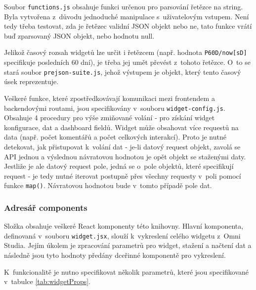 \documentclass[czech, bc, kiv, he, iso690numb]{fasthesis}
\begin{document}
Soubor \texttt{functions.js} obsahuje funkci určenou pro parsování řetězce na string. Byla vytvořena z~důvodu jednoduché manipulace s~uživatelovým vstupem. Není tedy třeba
testovat, zda je řetězec validní JSON objekt nebo ne, tato funkce vrátí buď zparsovaný JSON objekt, nebo hodnotu null.

Jelikož časový rozsah widgetů lze určit i řetězcem (např. hodnota \texttt{P60D/now[sD]} specifikuje posledních 60 dní), je třeba jej umět převést z~tohoto řetězce. O~to se stará soubor
\texttt{prejson-suite.js}, jehož výstupem je objekt, který tento časový úsek reprezentuje.

Veškeré funkce, které zpostředkovávají komunikaci mezi frontendem a backendovými routami, jsou specifikovány v~souboru \texttt{widget-config.js}. Obsahuje 4 procedury pro výše zmiňované
volání - pro získání widget konfigurace, dat a dashboard fieldů. Widget může obsahovat více requestů na data (např. počet komentářů a počet celkových interakcí). Proto je nutné detekovat,
jak přistupovat k~volání dat - je-li datový request objekt, zavolá se API jednou a výslednou návratovou hodnotou je opět objekt se staženými daty. Jestliže je ale datový request pole, jedná se o~pole objektů, které specifikují request - je tedy
nutné iterovat postupně přes všechny requesty v~poli pomocí funkce \texttt{map()}. Návratovou hodnotou bude v~tomto případě pole dat.

\subsubsection{Adresář components}

Složka obsahuje veškeré React komponenty této knihovny. Hlavní komponenta, definovaná v~souboru \texttt{widget.jsx}, slouží k~vykreslení celého widgetu z~Omni Studia. Jejím úkolem
je zpracování parametrů pro widget, stažení a načtení dat a následně jsou tyto hodnoty předány dceřinné komponentě pro vykreslení.

K~funkcionalitě je nutno specifikovat několik parametrů, které jsou specifikované v~tabulce \ref{tab:widgetProps}.
\end{document}
